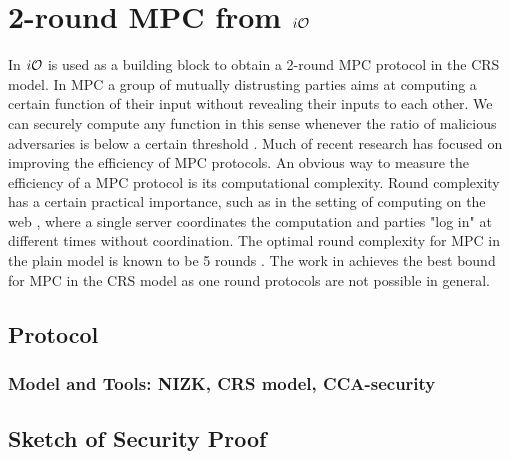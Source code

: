 \section{2-round MPC from $i\mathcal{O}$}

In \cite{MPC-iO} $i\mathcal{O}$ is used as a building block to obtain a 2-round MPC protocol in the CRS model. In MPC a group of mutually distrusting parties aims at computing a certain function of their input without revealing their inputs to each other. We can securely compute any function in this sense whenever the ratio of malicious adversaries is below a certain threshold \cite{}. %
Much of recent research has focused on improving the efficiency of MPC protocols. An obvious way to measure the efficiency of a MPC protocol is its computational complexity. Round complexity has a certain practical importance, such as in the setting of computing on the web \cite{}, %
where a single server coordinates the computation and parties "log in" at different times without coordination.
The optimal round complexity for MPC in the plain model is known to be 5 rounds \cite{katz2004round}. The work in \cite{MPC-iO} achieves the best bound for MPC in the CRS model as one round protocols are not possible in general.





\begin{comment}
What to say:
- 
\end{comment}





\subsection{Protocol}

\subsubsection{Model and Tools: NIZK, CRS model, CCA-security}

\subsection{Sketch of Security Proof}

